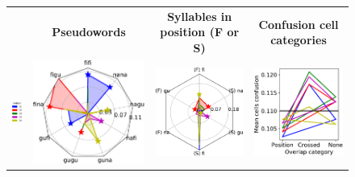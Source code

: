 \hspace{-5ex}
\begin{figure}[ht]
\scriptsize
\hspace{0ex}
\begin{tabular}{lccc}
{} & \textbf{\Large Pseudowords} & \textbf{\Large Syllables in position (F or S)} & \textbf{\Large Confusion cell categories}\\
\vspace{2ex}
\hspace{0ex}
{\includegraphics[width=.07\linewidth]{figures/part_II/subjects_legend.pdf}}
\hspace{-3ex}
&{\includegraphics[width=.3\linewidth]{figures/part_II/roi_plots/vwfa/radial_word.pdf}}
\hspace{-3ex}
&{\includegraphics[width=.3\linewidth]{figures/part_II/roi_plots/vwfa/radial_joint.pdf}}
\hspace{-3ex}
&{\includegraphics[width=.3\linewidth]{figures/part_II/roi_plots/vwfa/super_tests.pdf}}
\hspace{0ex}
\\
\end{tabular}

\end{figure}
